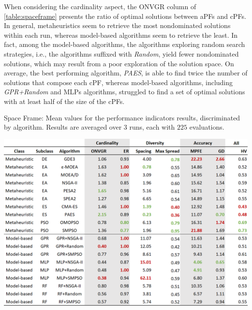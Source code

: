 When considering the cardinality aspect, the \ac{ONVGR} column of \cref{table:spaceframe} presents the ratio of optimal solutions between \acp{aPF} and \acp{cPF}. In general, metaheuristics seem to retrieve the most nondominated solutions within each run, whereas model-based algorithms seem to retrieve the least. In fact, among the model-based algorithms, the algorithms exploring random search strategies, i.e., the algorithms suffixed with \textit{Random}, yield fewer nondominated solutions, which may result from a poor exploration of the solution space. On average, the best performing algorithm, \textit{PAES}, is able to find twice the number of solutions that compose each \ac{cPF}, whereas model-based algorithms, including \textit{GPR+Random} and \acp{MLP} algorithms, struggled to find a set of optimal solutions with at least half of the size of the \acp{cPF}. 
\begin{table}[h!]
	\centering
	\caption[Space Frame: Mean values for the performance indicators results, discriminated per algorithms]{Space Frame: Mean values for the performance indicators results, discriminated by algorithm. Results are averaged over $3$ runs, each with $225$ evaluations.}
	\label{table:spaceframe}
	\includegraphics[width=\textwidth]{Images/Evaluation/caadria/Results_Mean_20190428.PNG}
\end{table}

